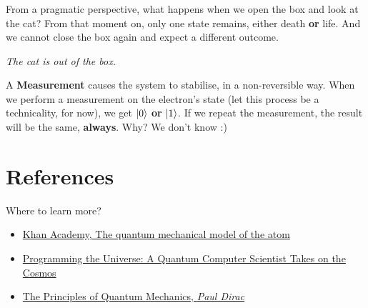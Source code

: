 \documentclass[aspectratio=43]{beamer}
\begin{document}
\subsubsection{\qmt}
\begin{frame}{\qmt}
    \begin{cardTiny}
        From a pragmatic perspective, what happens when we open the box and look at the cat? From that moment on, only one state remains, either death \textbf{or} life. And we cannot close the box again and expect a different outcome.
    \end{cardTiny}
    \begin{cardTiny}
        \centering\textit{The cat is out of the box.}
    \end{cardTiny}
    \begin{cardTiny}
        A \textbf{Measurement} causes the system to stabilise, in a non-reversible way. When we perform a measurement  on the electron's state (let this process be a technicality, for now), we get $\ket{0}$ \textbf{or} $\ket{1}$. If we repeat the measurement, the result will be the same, \textbf{always}. Why? We don't know :)
    \end{cardTiny}
\end{frame}

\section{References}
\begin{frame}{Where to learn more?}
\begin{card}
    \begin{itemize}
        \item \href{https://www.khanacademy.org/science/physics/quantum-physics/quantum-numbers-and-orbitals/a/the-quantum-mechanical-model-of-the-atom}{Khan Academy, The quantum mechanical model of the atom}
        \item \href{https://www.goodreads.com/book/show/331680.Programming_the_Universe}{Programming the Universe: A Quantum Computer Scientist Takes on the Cosmos}
        \item \href{https://www.goodreads.com/book/show/260142.The_Principles_of_Quantum_Mechanics}{The Principles of Quantum Mechanics, \textit{Paul Dirac}}
    \end{itemize}
\end{card}
\end{frame}
\end{document}
